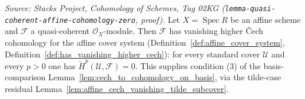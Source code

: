 \begin{lemma}
  \label{lem:affine_cech_vanishing_qcoh}
  \textit{Source: Stacks Project, Cohomology of Schemes, Tag 02KG
  (\texttt{lemma-quasi-coherent-affine-cohomology-zero}, proof).}
  Let \(X = \operatorname{Spec} R\) be an affine scheme and \(\mathcal{F}\) a quasi-coherent
  \(\mathcal{O}_X\)-module. Then \(\mathcal{F}\) has vanishing higher {\v C}ech cohomology for the
  affine cover system (Definition~\ref{def:affine_cover_system},
  Definition~\ref{def:has_vanishing_higher_cech}): for every standard cover \(\mathcal{U}\) and every
  \(p > 0\) one has \(\check{H}^p(\mathcal{U}, \mathcal{F}) = 0\). This supplies condition (3) of the
  basis-comparison Lemma~\ref{lem:cech_to_cohomology_on_basis}, via the tilde-case residual
  Lemma~\ref{lem:affine_cech_vanishing_tilde_subcover}.
\end{lemma}


